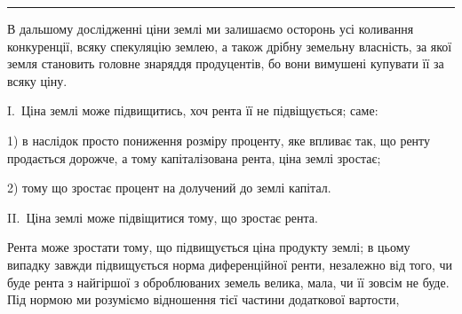 \pfbreak

В дальшому дослідженні ціни землі ми залишаємо осторонь усі коливання
конкуренції, всяку спекуляцію землею, а також дрібну земельну власність, за
якої земля становить головне знаряддя продуцентів, бо вони вимушені купувати її
за всяку ціну.

I.~Ціна землі може підвищитись, хоч рента її не підвіщується; саме:

1) в наслідок просто пониження розміру проценту, яке впливає так, що
ренту продається дорожче, а тому капіталізована рента, ціна землі зростає;

2) тому що зростає процент на долучений до землі капітал.

II.~Ціна землі може підвіщитися тому, що зростає рента.

Рента може зростати тому, що підвищується ціна продукту землі; в цьому
випадку завжди підвищується норма диференційної ренти, незалежно від того,
чи буде рента з найгіршої з оброблюваних земель велика, мала, чи її зовсім
не буде. Під нормою ми розуміємо відношення тієї частини додаткової вартости,
\parbreak{}  %
